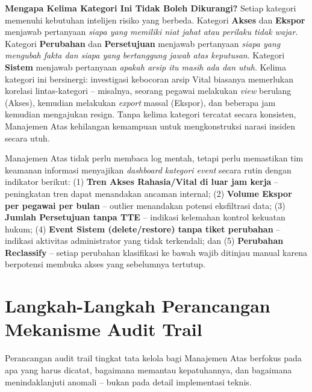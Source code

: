 \documentclass[12pt,a4paper]{report}
\begin{document}
\noindent\textbf{Mengapa Kelima Kategori Ini Tidak Boleh Dikurangi?} Setiap kategori memenuhi kebutuhan intelijen risiko yang berbeda. Kategori \textbf{Akses} dan \textbf{Ekspor} menjawab pertanyaan \textit{siapa yang memiliki niat jahat atau perilaku tidak wajar}. Kategori \textbf{Perubahan} dan \textbf{Persetujuan} menjawab pertanyaan \textit{siapa yang mengubah fakta dan siapa yang bertanggung jawab atas keputusan}. Kategori \textbf{Sistem} menjawab pertanyaan \textit{apakah arsip itu masih ada dan utuh}. Kelima kategori ini bersinergi: investigasi kebocoran arsip Vital biasanya memerlukan korelasi lintas-kategori -- misalnya, seorang pegawai melakukan \textit{view} berulang (Akses), kemudian melakukan \textit{export} massal (Ekspor), dan beberapa jam kemudian mengajukan resign. Tanpa kelima kategori tercatat secara konsisten, Manajemen Atas kehilangan kemampuan untuk mengkonstruksi narasi insiden secara utuh.

\begin{plnbox}
Manajemen Atas tidak perlu membaca log mentah, tetapi perlu memastikan tim keamanan informasi menyajikan \textit{dashboard kategori event} secara rutin dengan indikator berikut: (1) \textbf{Tren Akses Rahasia/Vital di luar jam kerja} -- peningkatan tren dapat menandakan ancaman internal; (2) \textbf{Volume Ekspor per pegawai per bulan} -- outlier menandakan potensi eksfiltrasi data; (3) \textbf{Jumlah Persetujuan tanpa TTE} -- indikasi kelemahan kontrol kekuatan hukum; (4) \textbf{Event Sistem (delete/restore) tanpa tiket perubahan} -- indikasi aktivitas administrator yang tidak terkendali; dan (5) \textbf{Perubahan Reclassify} -- setiap perubahan klasifikasi ke bawah wajib ditinjau manual karena berpotensi membuka akses yang sebelumnya tertutup.
\end{plnbox}

\section{Langkah-Langkah Perancangan Mekanisme Audit Trail}
Perancangan audit trail tingkat tata kelola bagi Manajemen Atas berfokus pada apa yang harus dicatat, bagaimana memantau kepatuhannya, dan bagaimana menindaklanjuti anomali -- bukan pada detail implementasi teknis.
\end{document}
